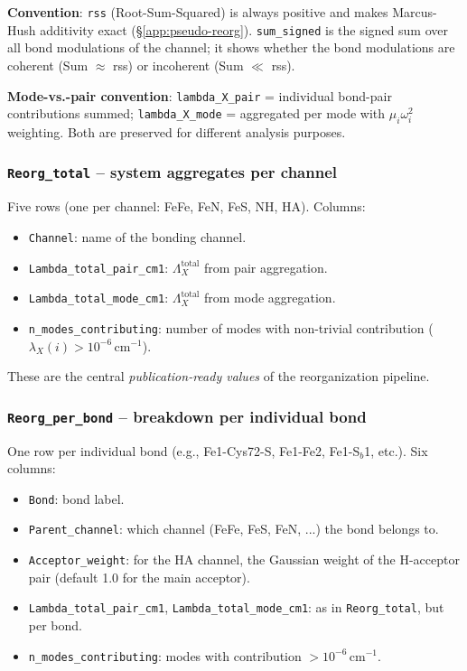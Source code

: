 \documentclass[11pt,a4paper,twoside]{article}
\theoremstyle{remark}
\begin{document}
\textbf{Convention}: \texttt{rss} (Root-Sum-Squared) is always
positive and makes Marcus-Hush additivity exact
(\S\ref{app:pseudo-reorg}). \texttt{sum\_signed} is the signed sum
over all bond modulations of the channel; it shows whether the
bond modulations are coherent (Sum $\approx$ rss) or incoherent
(Sum $\ll$ rss).

\textbf{Mode-vs.-pair convention}: \texttt{lambda\_X\_pair} =
individual bond-pair contributions summed; \texttt{lambda\_X\_mode}
= aggregated per mode with $\mu_i\omega_i^2$ weighting. Both are
preserved for different analysis purposes.

\subsubsection*{\texttt{Reorg\_total} -- system aggregates per channel}

Five rows (one per channel: FeFe, FeN, FeS, NH, HA). Columns:

\begin{itemize}\setlength{\itemsep}{0pt}
  \item \texttt{Channel}: name of the bonding channel.
  \item \texttt{Lambda\_total\_pair\_cm1}: $\Lambda_X^\text{total}$
        from pair aggregation.
  \item \texttt{Lambda\_total\_mode\_cm1}: $\Lambda_X^\text{total}$
        from mode aggregation.
  \item \texttt{n\_modes\_contributing}: number of modes with
        non-trivial contribution
        ($\lambda_X(i) > 10^{-6}$\,cm$^{-1}$).
\end{itemize}

These are the central \emph{publication-ready values} of the
reorganization pipeline.

\subsubsection*{\texttt{Reorg\_per\_bond} -- breakdown per individual bond}

One row per individual bond (e.g., Fe1-Cys72-S, Fe1-Fe2,
Fe1-S$_b$1, etc.). Six columns:

\begin{itemize}\setlength{\itemsep}{0pt}
  \item \texttt{Bond}: bond label.
  \item \texttt{Parent\_channel}: which channel
        (FeFe, FeS, FeN, ...) the bond belongs to.
  \item \texttt{Acceptor\_weight}: for the HA channel, the
        Gaussian weight of the H-acceptor pair (default 1.0 for
        the main acceptor).
  \item \texttt{Lambda\_total\_pair\_cm1},
        \texttt{Lambda\_total\_mode\_cm1}: as in
        \texttt{Reorg\_total}, but per bond.
  \item \texttt{n\_modes\_contributing}: modes with contribution
        $> 10^{-6}$\,cm$^{-1}$.
\end{itemize}
\end{document}

